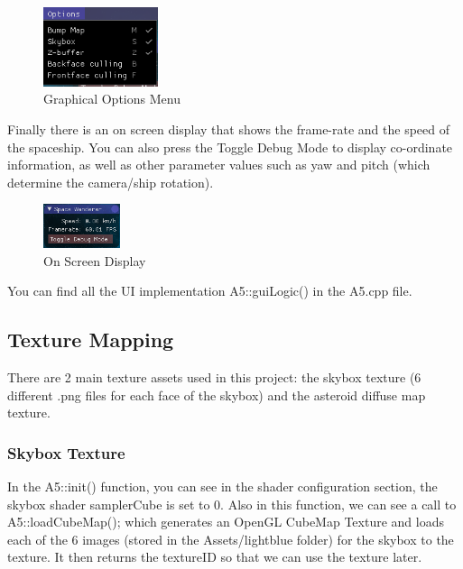 \documentclass {article}
\begin{document}
\begin{figure}[h]
\begin{center}
	\includegraphics[width=0.3\textwidth]{optionsmenu.png}
	\caption{Graphical Options Menu}
  \label{fig:options}
\end{center}
\end{figure}


Finally there is an on screen display that shows the frame-rate and the speed of the spaceship. You can also press the Toggle Debug Mode to display co-ordinate information, as well as other parameter values such as yaw and pitch (which determine the camera/ship rotation).

\begin{figure}[h]
\begin{center}
	\includegraphics[width=0.2\textwidth]{onscreen.png}
	\caption{On Screen Display}
  \label{fig:onscreen}
\end{center}
\end{figure}

You can find all the UI implementation A5::guiLogic() in the A5.cpp file.

\subsection{Texture Mapping}
\hspace{0.5cm}There are 2 main texture assets used in this project: the skybox texture (6 different .png files for each face of the skybox) and the asteroid diffuse map texture. 

\subsubsection{Skybox Texture}
\hspace{0.5cm}In the A5::init() function, you can see in the shader configuration section, the skybox shader samplerCube is set to 0. Also in this function, we can see a call to A5::loadCubeMap();
which generates an OpenGL CubeMap Texture and loads each of the 6 images (stored in the Assets/lightblue folder) for the skybox to the texture. It then returns the textureID so that we can use the texture later.
\end{document}

